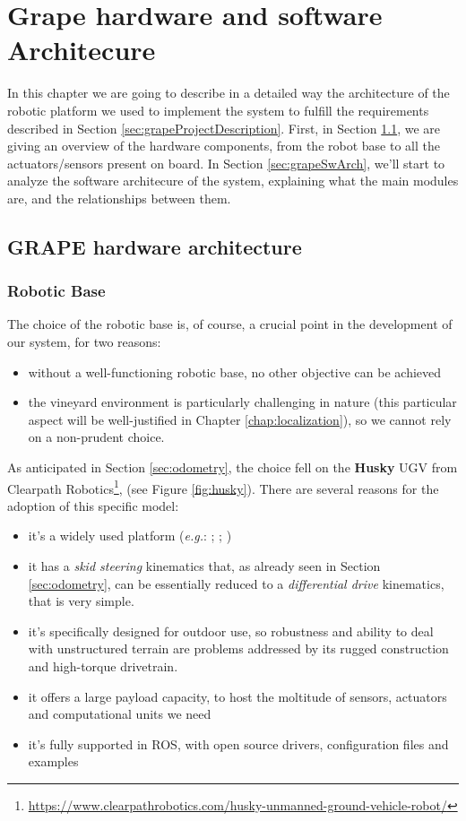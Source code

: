 
\chapter{Grape hardware and software Architecure} \label{chap:grapeSoftwareArchitecture}

In this chapter we are going to describe in a detailed way the architecture of the robotic platform we used to implement the system to fulfill the requirements described in Section \ref{sec:grapeProjectDescription}. First, in Section \ref{sec:grapeHwArch}, we are giving an overview of the hardware components, from the robot base to all the actuators/sensors present on board. In Section \ref{sec:grapeSwArch}, we'll start to analyze the software architecure of the system, explaining what the main modules are, and the relationships between them.

\section{GRAPE hardware architecture}\label{sec:grapeHwArch}

\subsection{Robotic Base}
The choice of the robotic base is, of course, a crucial point in the development of our system, for two reasons:
\begin{itemize}
	\item without a well-functioning robotic base, no other objective can be achieved
	\item the vineyard environment is particularly challenging in nature (this particular aspect will be well-justified in Chapter \ref{chap:localization}), so we cannot rely on a non-prudent choice.
\end{itemize}
As anticipated in Section \ref{sec:odometry}, the choice fell on the \textbf{Husky} \ac{UGV} from Clearpath Robotics\footnote{\url{https://www.clearpathrobotics.com/husky-unmanned-ground-vehicle-robot/}},
(see Figure \ref{fig:husky}). There are several reasons for the adoption of this specific model:
\begin{itemize}
	\item it's a widely used platform (\textit{e.g.}: \cite{husky1}; \cite{husky2}; \cite{husky3})
	\item it has a \textit{skid steering} kinematics that, as already seen in Section \ref{sec:odometry}, can be essentially reduced to a \textit{differential drive} kinematics, that is very simple.
	\item it's specifically designed for outdoor use, so robustness and ability to deal with unstructured terrain are problems addressed by its rugged construction and high-torque drivetrain.
	\item it offers a large payload capacity, to host the moltitude of sensors, actuators and computational units we need
	\item it's fully supported in \ac{ROS}, with open source drivers, configuration files and examples
\end{itemize}

